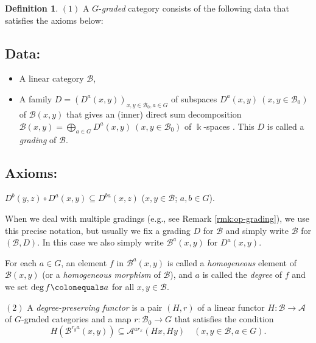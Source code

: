 \documentclass{surv-l}
\numberwithin{equation}{chapter}
\numberwithin{figure}{chapter}
\theoremstyle{plain}
\theoremstyle{definition}
\newtheorem{dfn}[thm]{Definition}
\theoremstyle{remark}
\begin{document}
\begin{dfn}\label{dfn-graded-cat}
$(1)$ A $G$-\emph{graded} category consists of the following data that satisfies the
axioms below:

\subsection*{Data:}
\begin{itemize}
\item
A linear category $\mathcal{B}$,
\item
A family $D = (D^a(x, y))_{x,y\in \mathcal{B}_0, a \in G}$  of subspaces $D^a(x, y)\ (x,y \in \mathcal{B}_0)$
of $\mathcal{B}(x, y)$ that gives an (inner) direct sum decomposition
$\mathcal{B}(x,y) = \bigoplus_{a\in G}D^{a}(x,y)\ (x,y \in \mathcal{B}_0)$
of $\Bbbk$-spaces .  This $D$ is called a \emph{grading} of $\mathcal{B}$.
\end{itemize}


\subsection*{Axioms:}
$D^{b}(y,z)\circ D^{a}(x,y)\subseteq D^{ba}(x,z)$
($x,y\in\mathcal{B}$; $a,b\in G$).

When we deal with multiple gradings (e.g., see Remark  \ref{rmk:op-grading}),
we use this precise notation, but
usually we fix a grading $D$ for $\mathcal{B}$ and simply write $\mathcal{B}$ for $(\mathcal{B}, D)$.
In this case we also simply write $\mathcal{B}^a(x, y)$ for $D^a(x, y)$.

For each $a\in G$, an element $f$ in $\mathcal{B}^{a}(x,y)$ is called
a \emph{homogeneous} element of $\mathcal{B}(x, y)$ (or a \emph{homogeneous morphism} of $\mathcal{B}$),
and $a$ is called the \emph{degree} of $f$ and we set
$\deg f\colonequals a$ for all $x, y \in \mathcal{B}$.

$(2)$ A  \emph{degree-preserving functor} is a pair $(H,r)$ of
a linear functor $H\colon\mathcal{B}\to\mathcal{A}$ of $G$-graded
categories
and a map $r\colon \mathcal{B}_0\to G$ that satisfies the condition
\[
H(\mathcal{B}^{r_{y}a}(x,y))\subseteq\mathcal{A}{}^{ar_{x}}(Hx,Hy)
\quad
(x,y\in\mathcal{B}, a\in G).
\]


\end{dfn}
\end{document}
